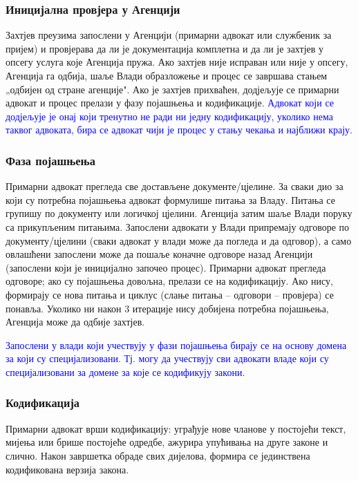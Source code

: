 \documentclass[12pt,a4paper]{article}
\newcommand{\optional}[1]{\textcolor{blue}{#1}}
\begin{document}
\subsubsection{Иницијална провјера у Агенцији}

Захтјев преузима запослени у Агенцији (примарни адвокат или службеник за пријем) и провјерава да ли је документација комплетна и да ли је захтјев у опсегу услуга које Агенција пружа. Ако захтјев није исправан или није у опсегу, Агенција га одбија, шаље Влади образложење и процес се завршава стањем „одбијен од стране агенције". Ако је захтјев прихваћен, додјељује се примарни адвокат и процес прелази у фазу појашњења и кодификације. \optional{Адвокат који се додјељује је онај који тренутно не ради ни једну кодификацију, уколико нема таквог адвоката, бира се адвокат чији је процес у стању чекања и најближи крају.}

\subsubsection{Фаза појашњења}

Примарни адвокат прегледа све достављене документе/цјелине. За сваки дио за који су потребна појашњења адвокат формулише питања за Владу. Питања се групишу по документу или логичкој цјелини. Агенција затим шаље Влади поруку са прикупљеним питањима. Запослени адвокати у Влади припремају одговоре по документу/цјелини (сваки адвокат у влади може да погледа и да одговор), а само овлашћени запослени може да пошаље коначне одговоре назад Агенцији (запослени који је иницијално започео процес). Примарни адвокат прегледа одговоре; ако су појашњења довољна, прелази се на кодификацију. Ако нису, формирају се нова питања и циклус (слање питања – одговори – провјера) се понавља. Уколико ни након 3 итерације нису добијена потребна појашњења, Агенција може да одбије захтјев.

\optional{Запослени у влади који учествују у фази појашњења бирају се на основу домена за који су специјализовани. Тј. могу да учествују сви адвокати владе који су специјализовани за домене за које се кодификују закони.}

\subsubsection{Кодификација}

Примарни адвокат врши кодификацију: уграђује нове чланове у постојећи текст, мијења или брише постојеће одредбе, ажурира упућивања на друге законе и слично. Након завршетка обраде свих дијелова, формира се јединствена кодификована верзија закона.
\end{document}
